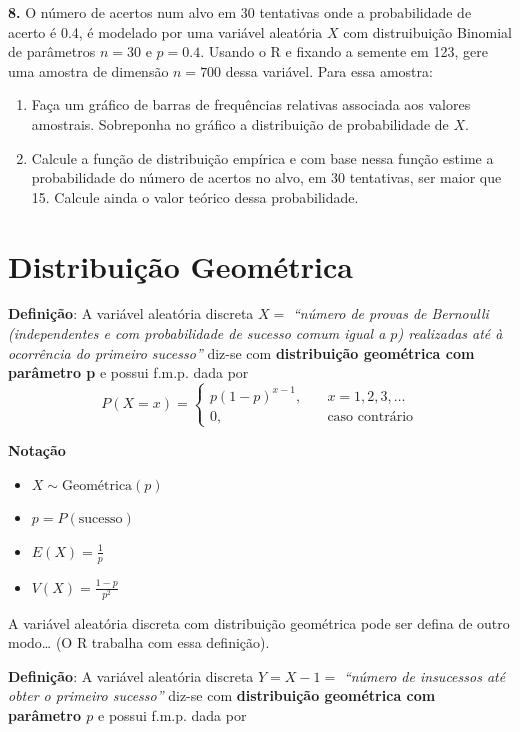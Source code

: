\documentclass[
]{book}
\providecommand{\tightlist}{%
  \setlength{\itemsep}{0pt}\setlength{\parskip}{0pt}}
\begin{document}
\textbf{8.} O número de acertos num alvo em 30 tentativas onde a
probabilidade de acerto é 0.4, é modelado por uma variável aleatória \(X\)
com distruibuição Binomial de parâmetros \(n=30\) e \(p=0.4\). Usando o R e
fixando a semente em 123, gere uma amostra de dimensão \(n=700\) dessa
variável. Para essa amostra:

\begin{enumerate}
\def\labelenumi{(\alph{enumi})}
\item
  Faça um gráfico de barras de frequências relativas associada aos valores amostrais. Sobreponha no gráfico a distribuição de probabilidade de \(X\).
\item
  Calcule a função de distribuição empírica e com base nessa
  função estime a probabilidade do número de acertos no alvo, em 30
  tentativas, ser maior que 15. Calcule ainda o valor teórico dessa
  probabilidade.
\end{enumerate}

\section{Distribuição Geométrica}\label{distribuiuxe7uxe3o-geomuxe9trica}

\textbf{Definição}: A variável aleatória discreta \(X=\) \emph{``número de provas de Bernoulli (independentes e com probabilidade de sucesso
comum igual a \(p\)) realizadas até à ocorrência do primeiro sucesso''} diz-se com \textbf{distribuição geométrica com parâmetro p} e possui f.m.p. dada por
\[P(X=x) = \begin{cases}
p(1-p)^{x-1},& \quad x=1,2,3,\ldots \\
0,& \quad \text{caso contrário}
\end{cases}\]

\textbf{Notação}

\begin{itemize}
\tightlist
\item
  \(X \sim \text{Geométrica}(p)\)
\item
  \(p = P(\text{sucesso})\)
\item
  \(E(X) = \frac{1}{p}\)
\item
  \(V(X) = \frac{1-p}{p^2}\)
\end{itemize}

A variável aleatória discreta com distribuição geométrica pode ser defina de outro modo\ldots{} (O R trabalha com essa definição).

\textbf{Definição}: A variável aleatória discreta \(Y= X-1 =\) \emph{``número de insucessos até obter o primeiro sucesso''} diz-se com \textbf{distribuição geométrica com parâmetro \(p\)} e possui f.m.p. dada por
\end{document}
